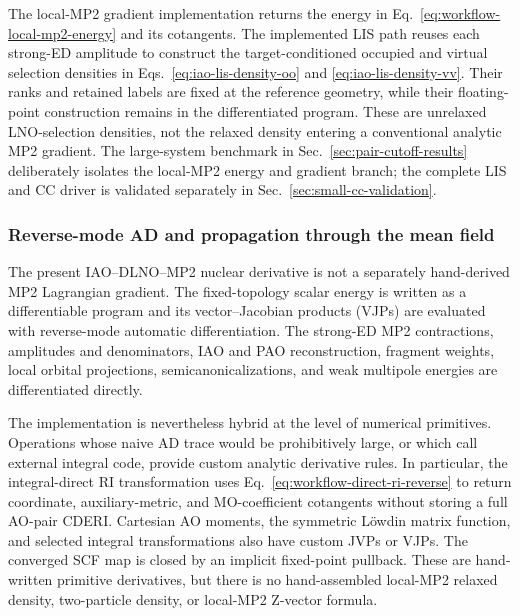 \documentclass[11pt]{article}
\begin{document}
The local-MP2 gradient implementation returns the energy in
Eq.~\eqref{eq:workflow-local-mp2-energy} and its cotangents.  The implemented
LIS path reuses each strong-ED amplitude to construct the target-conditioned
occupied and virtual selection densities in
Eqs.~\eqref{eq:iao-lis-density-oo} and
\eqref{eq:iao-lis-density-vv}.  Their ranks and retained labels are fixed at
the reference geometry, while their floating-point construction remains in
the differentiated program.  These are unrelaxed LNO-selection densities,
not the relaxed density entering a conventional analytic MP2 gradient.  The
large-system benchmark in Sec.~\ref{sec:pair-cutoff-results} deliberately
isolates the local-MP2 energy and gradient branch; the complete LIS and CC
driver is validated separately in Sec.~\ref{sec:small-cc-validation}.

\subsubsection{Reverse-mode AD and propagation through the mean field}
\label{sec:iao-mp2-mf-cotangent}

The present IAO--DLNO--MP2 nuclear derivative is not a separately
hand-derived MP2 Lagrangian gradient.  The fixed-topology scalar energy is
written as a differentiable program and its vector--Jacobian products (VJPs)
are evaluated with reverse-mode automatic differentiation.  The strong-ED
MP2 contractions, amplitudes and denominators, IAO and PAO reconstruction,
fragment weights, local orbital projections, semicanonicalizations, and weak
multipole energies are differentiated directly.

The implementation is nevertheless hybrid at the level of numerical
primitives.  Operations whose naive AD trace would be prohibitively large,
or which call external integral code, provide custom analytic derivative
rules.  In particular, the integral-direct RI transformation uses
Eq.~\eqref{eq:workflow-direct-ri-reverse} to return coordinate,
auxiliary-metric, and MO-coefficient cotangents without storing a full
AO-pair CDERI.  Cartesian AO moments, the symmetric L\"owdin matrix function,
and selected integral transformations also have custom JVPs or VJPs.  The
converged SCF map is closed by an implicit fixed-point pullback.  These are
hand-written primitive derivatives, but there is no hand-assembled local-MP2
relaxed density, two-particle density, or local-MP2 Z-vector formula.
\end{document}
